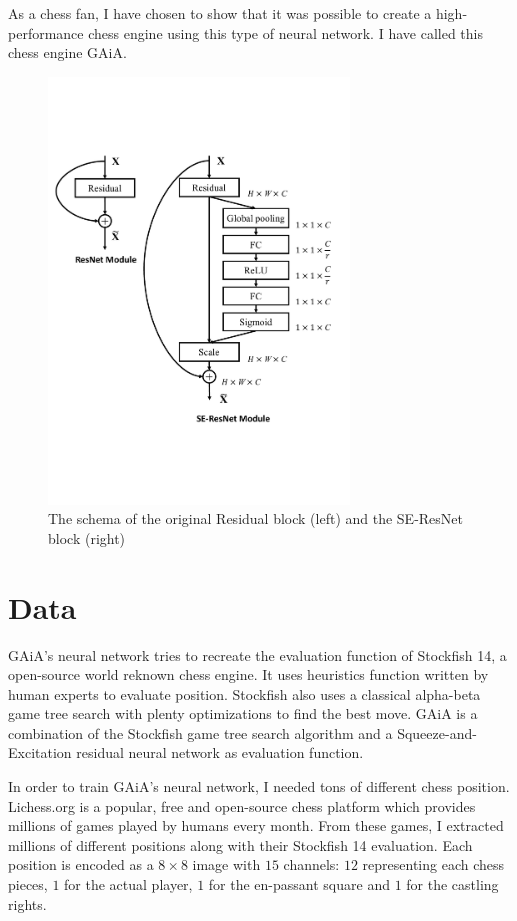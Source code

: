\documentclass[a4paper]{article}
\begin{document}
As a chess fan, I have chosen to show that it was possible to create a
high-performance chess engine using this type of neural network.
I have called this chess engine GAiA.

\begin{figure}[H]
  \centering
  \includegraphics[width=8cm]{module_seresnet.pdf}
  \caption{The schema of the original Residual block (left) and the SE-ResNet
  block (right)}
  \label{fig:seblock}
\end{figure}

\section{Data}
GAiA's neural network tries to recreate the evaluation function of Stockfish 14,
a open-source world reknown chess engine. It uses heuristics function written
by human experts to evaluate position. Stockfish also uses a classical
alpha-beta game tree search with plenty optimizations to find the best move.
GAiA is a combination of the Stockfish game tree search algorithm and a
Squeeze-and-Excitation residual neural network as evaluation function.

In order to train GAiA's neural network, I needed tons of different
chess position. Lichess.org\cite{lichess} is a popular, free and open-source
chess platform which provides millions of games played by humans every month.
From these games, I extracted millions of different positions along with their
Stockfish 14 evaluation.
Each position is encoded as a $8\times8$ image with $15$ channels: 
$12$ representing each chess pieces, $1$ for the actual player, $1$
for the en-passant square and $1$ for the castling rights.
\end{document}

